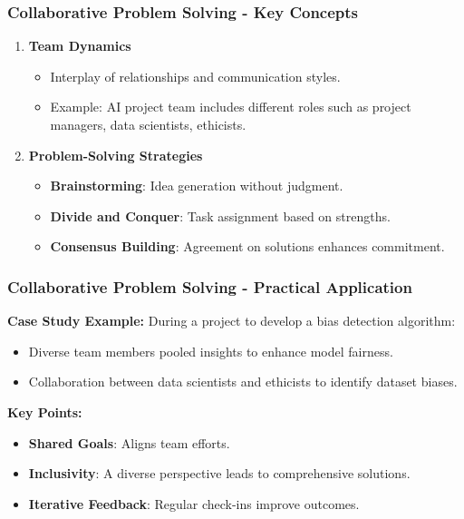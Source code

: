\documentclass{beamer}
\begin{document}
\begin{frame}[fragile]
    \frametitle{Collaborative Problem Solving - Key Concepts}
    \begin{enumerate}
        \item \textbf{Team Dynamics}
            \begin{itemize}
                \item Interplay of relationships and communication styles.
                \item Example: AI project team includes different roles such as project managers, data scientists, ethicists.
            \end{itemize}
        
        \item \textbf{Problem-Solving Strategies}
            \begin{itemize}
                \item \textbf{Brainstorming}: Idea generation without judgment.
                \item \textbf{Divide and Conquer}: Task assignment based on strengths.
                \item \textbf{Consensus Building}: Agreement on solutions enhances commitment.
            \end{itemize}
    \end{enumerate}
\end{frame}

\begin{frame}[fragile]
    \frametitle{Collaborative Problem Solving - Practical Application}
    \textbf{Case Study Example:} During a project to develop a bias detection algorithm:
    \begin{itemize}
        \item Diverse team members pooled insights to enhance model fairness.
        \item Collaboration between data scientists and ethicists to identify dataset biases.
    \end{itemize}
    
    \textbf{Key Points:}
    \begin{itemize}
        \item \textbf{Shared Goals}: Aligns team efforts.
        \item \textbf{Inclusivity}: A diverse perspective leads to comprehensive solutions.
        \item \textbf{Iterative Feedback}: Regular check-ins improve outcomes.
    \end{itemize}
\end{frame}
\end{document}

